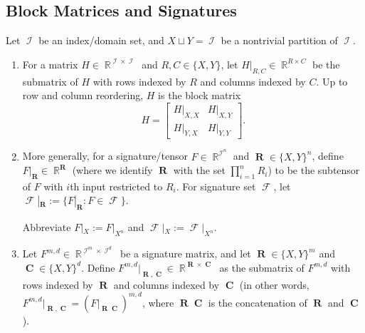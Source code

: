 \documentclass{article}
\DeclareMathOperator{\rr}{\mathbb{R}}
\DeclareMathOperator{\vr}{\mathbf{R}}
\DeclareMathOperator{\vc}{\mathbf{C}}
\DeclareMathOperator{\ic}{\mathcal{I}}
\DeclareMathOperator{\fc}{\mathcal{F}}
\begin{document}
\subsection{Block Matrices and Signatures}
\label{sec:block}
\begin{definition}
    \label{def:block}
    Let $\ic$ be an index/domain set, and $X \sqcup Y = \ic$ be a nontrivial partition of $\ic$.
    \begin{enumerate}
    \item
    For a matrix $H \in \rr^{\ic \times \ic}$ and $R,C \in \{X,Y\}$, let $H|_{R,C} \in \rr^{R\times C}$ be the
    submatrix of $H$ with rows indexed by $R$ and columns indexed by $C$. Up to row and
    column reordering, $H$ is the block matrix
    \[
        H = \begin{bmatrix} H|_{X,X} & H|_{X,Y} \\ H|_{Y,X} & H|_{Y,Y}\end{bmatrix}.
    \]
    \item
    More generally, for a signature/tensor $F \in \rr^{\ic^n}$ and $\vr \in \{X,Y\}^n$, define
    $F|_{\vr} \in \rr^{\vr}$ (where we identify $\vr$ with the set $\prod_{i=1}^n R_i$) to be the subtensor of $F$ with $i$th
    input restricted to $R_i$.
    For signature set $\fc$, let $\fc|_{\vr} := \{F|_{\vr}: F \in \fc\}$.

    Abbreviate $F|_X := F|_{X^n}$ and $\fc|_X := \fc|_{X^n}$.
    \item 
    Let $F^{m,d} \in \rr^{\ic^m \times \ic^d}$ be a signature matrix, and let 
    $\vr \in \{X,Y\}^m$ and $\vc \in \{X,Y\}^d$. Define 
    $F^{m,d}|_{\vr,\vc} \in \rr^{\vr \times \vc}$
    as the submatrix of $F^{m,d}$ with rows indexed by $\vr$ and columns indexed by
    $\vc$ (in other words, $F^{m,d}|_{\vr,\vc} = (F|_{\vr\vc})^{m,d}$, where
    $\vr\vc$ is the concatenation of $\vr$ and $\vc$).
    \end{enumerate}
\end{definition}
\end{document}

